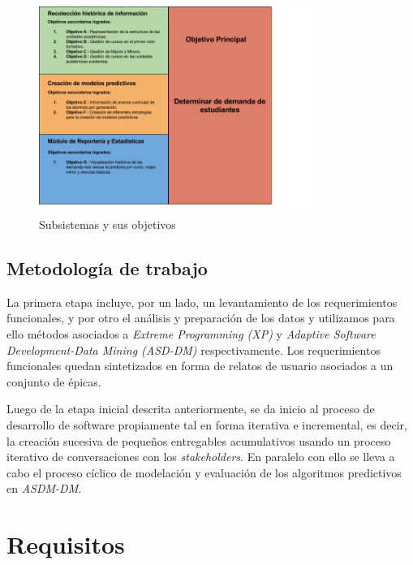 \begin{figure}[ht]
	\begin{center}
	  \includegraphics[width=0.8\textwidth]{./figures/chapter_03/01_objetivos.png}
	  \caption{Subsistemas y sus objetivos}
	  \label{fig:subsystems}
	\end{center}
\end{figure}

\subsection{Metodología de trabajo \label{sec:work_methodology}}

La primera etapa incluye, por un lado, un levantamiento de los requerimientos funcionales, y por otro el análisis y preparación de los datos y utilizamos para ello métodos asociados a \textit{Extreme Programming (XP)} y \textit{Adaptive Software Development-Data Mining (ASD-DM)} respectivamente.   Los requerimientos funcionales quedan sintetizados en forma de relatos de usuario asociados a un conjunto de épicas.

Luego de la etapa inicial descrita anteriormente, se da inicio al proceso de desarrollo de software propiamente tal en forma iterativa e incremental, es decir, la creación sucesiva de pequeños entregables acumulativos usando un proceso iterativo de conversaciones con los \textit{stakeholders}. En paralelo con ello se lleva a cabo el proceso cíclico de modelación y evaluación de los algoritmos predictivos en \textit{ASDM-DM}.

\section{Requisitos \label{sec:requirements}}
